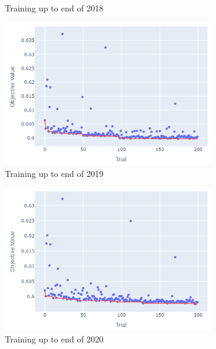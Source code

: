 \documentclass[12pt,twoside]{report}
\begin{document}
\begin{figure}[htb]
\begin{subfigure}{.33\linewidth}
  \caption{Training up to end of 2018}
\end{subfigure}
\par\bigskip
\par\bigskip
\begin{subfigure}{.33\linewidth}
  \centering
  \includegraphics[width=0.95\linewidth]{figures/lightgbm_cutoff_2019.png}
  \caption{Training up to end of 2019}
\end{subfigure}%
\begin{subfigure}{.33\linewidth}
  \centering
  \includegraphics[width=0.95\linewidth]{figures/lightgbm_cutoff_2020.png}
  \caption{Training up to end of 2020}
\end{subfigure}%
\begin{subfigure}{.33\linewidth}
  \centering

\end{subfigure}
\end{figure}
\end{document}
